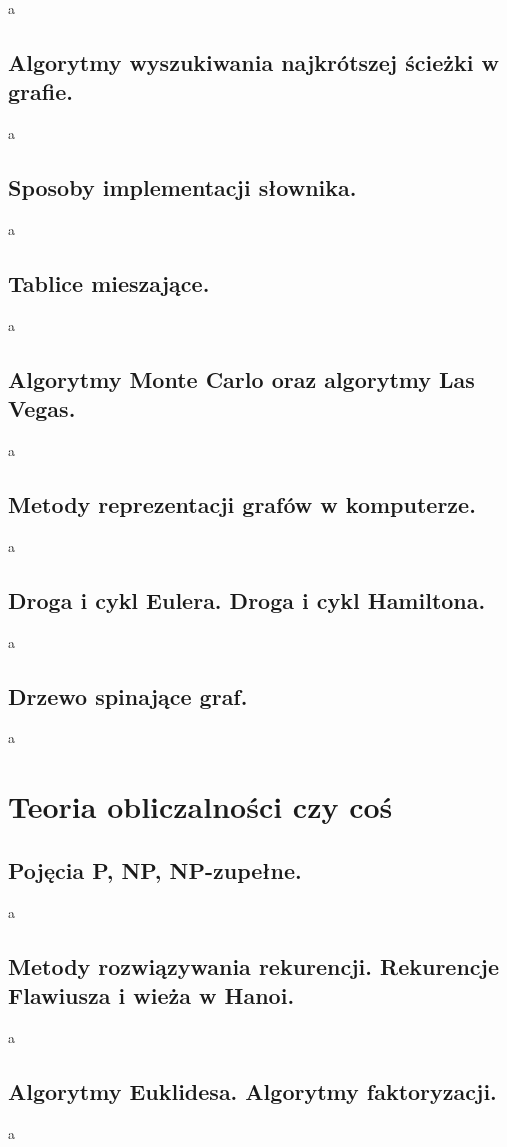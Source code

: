 \documentclass[a4paper,12pt,oneside]{book}
\begin{document}
				a
			\newpage\subsection{\color{red}Algorytmy wyszukiwania najkrótszej ścieżki w grafie.}
				a
			\newpage\subsection{\color{red}Sposoby implementacji słownika.}
				a
			\newpage\subsection{\color{red}Tablice mieszające.}
				a
			\newpage\subsection{\color{red}Algorytmy Monte Carlo oraz algorytmy Las Vegas.}
				a
			\newpage\subsection{\color{red}Metody reprezentacji grafów w komputerze.}
				a
			\newpage\subsection{\color{red}Droga i cykl Eulera. Droga i cykl Hamiltona.}
				a
			\newpage\subsection{\color{red}Drzewo spinające graf.}
				a
		
		\newpage\section{Teoria obliczalności czy coś}
			\subsection{\color{red}Pojęcia P, NP, NP-zupełne.}
				a
			\newpage\subsection{\color{red}Metody rozwiązywania rekurencji. Rekurencje Flawiusza i wieża w Hanoi.}
				a
			\newpage\subsection{\color{red}Algorytmy Euklidesa. Algorytmy faktoryzacji.}
				a
		
\end{document}

